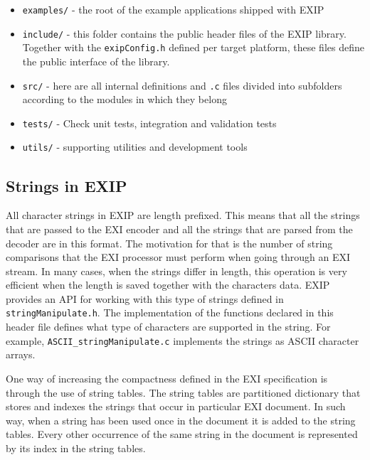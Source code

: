 \begin{itemize}
 \item \texttt{examples/} - the root of the example applications shipped with EXIP

 \item \texttt{include/} - this folder contains the public header files of the EXIP library.
			  Together with the \texttt{exipConfig.h} defined per target platform, these files
			  define the public interface of the library.

 \item \texttt{src/} - here are all internal definitions and \texttt{.c} files divided into
	      subfolders according to the modules in which they belong

 \item \texttt{tests/} - Check unit tests, integration and validation tests

 \item \texttt{utils/} - supporting utilities and development tools

\end{itemize}


\subsection{Strings in EXIP}
\label{sec:strings}

All character strings in EXIP are length prefixed. This means that all the strings that are passed to
the EXI encoder and all the strings that are parsed from the decoder are in this format. The motivation
for that is the number of string comparisons that the EXI processor must perform when going through an
EXI stream. In many cases, when the strings differ in length, this operation is very efficient
when the length is saved together with the characters data. EXIP provides an API for working with
this type of strings defined in \texttt{stringManipulate.h}. The implementation of the functions
declared in this header file defines what type of characters are supported in the string.
For example, \texttt{ASCII\_stringManipulate.c} implements the strings as ASCII character arrays.

One way of increasing the compactness defined in the EXI specification is through the use of string tables.
The string tables are partitioned dictionary that stores and indexes the strings that occur in particular
EXI document. In such way, when a string has been used once in the document it is added to the string tables.
Every other occurrence of the same string in the document is represented by its index in the string tables.

